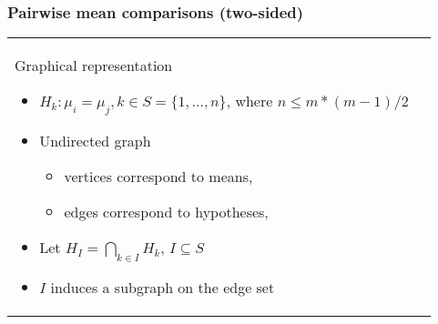 \documentclass[bigger]{beamer}
\begin{document}
\begin{frame}
\frametitle{Pairwise mean comparisons (two-sided)}
\begin{tabular}{ll}

  \begin{minipage}{.5\textwidth}
    
  \end{minipage} 
  \begin{minipage}{.5\textwidth}
    \begin{block}{Graphical representation}
      \begin{itemize}
      \item $H_k: \mu_i = \mu_j, k \in S = \{1,...,n\}$, where $n \leq
        m*(m-1)/2$

      \item Undirected graph %
        \begin{itemize}
        \item vertices correspond to means, 
        \item edges correspond to hypotheses, 
        \end{itemize}
      \item Let $H_I = \bigcap_{k \in I} H_k$, $I \subseteq S$
      \item $I$ induces a subgraph %
        on the edge set
      \end{itemize} %
    \end{block}
  \end{minipage} 

\end{tabular}
\end{frame}

\end{document}
